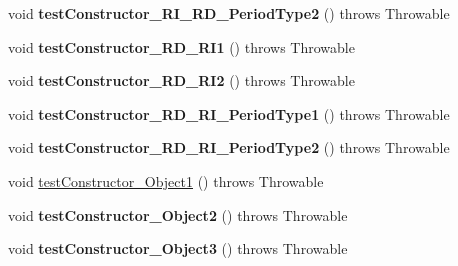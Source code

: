 \begin{DoxyCompactItemize}
\item 
\hypertarget{classorg_1_1joda_1_1time_1_1_test_period___constructors_abe4348279d9c3c1cb35042d17695a446}{void {\bfseries test\-Constructor\-\_\-\-R\-I\-\_\-\-R\-D\-\_\-\-Period\-Type2} ()  throws Throwable }\label{classorg_1_1joda_1_1time_1_1_test_period___constructors_abe4348279d9c3c1cb35042d17695a446}

\item 
\hypertarget{classorg_1_1joda_1_1time_1_1_test_period___constructors_ae15ae9a6ff55c679ef38916bf9cb82c7}{void {\bfseries test\-Constructor\-\_\-\-R\-D\-\_\-\-R\-I1} ()  throws Throwable }\label{classorg_1_1joda_1_1time_1_1_test_period___constructors_ae15ae9a6ff55c679ef38916bf9cb82c7}

\item 
\hypertarget{classorg_1_1joda_1_1time_1_1_test_period___constructors_a23d6eb392bccca0793971d33010d9e8f}{void {\bfseries test\-Constructor\-\_\-\-R\-D\-\_\-\-R\-I2} ()  throws Throwable }\label{classorg_1_1joda_1_1time_1_1_test_period___constructors_a23d6eb392bccca0793971d33010d9e8f}

\item 
\hypertarget{classorg_1_1joda_1_1time_1_1_test_period___constructors_a16fbaf9ef12c96666bacb841215ccca3}{void {\bfseries test\-Constructor\-\_\-\-R\-D\-\_\-\-R\-I\-\_\-\-Period\-Type1} ()  throws Throwable }\label{classorg_1_1joda_1_1time_1_1_test_period___constructors_a16fbaf9ef12c96666bacb841215ccca3}

\item 
\hypertarget{classorg_1_1joda_1_1time_1_1_test_period___constructors_aa684f3c626f57d73267c97d3e49c3b7b}{void {\bfseries test\-Constructor\-\_\-\-R\-D\-\_\-\-R\-I\-\_\-\-Period\-Type2} ()  throws Throwable }\label{classorg_1_1joda_1_1time_1_1_test_period___constructors_aa684f3c626f57d73267c97d3e49c3b7b}

\item 
void \hyperlink{classorg_1_1joda_1_1time_1_1_test_period___constructors_a3dd47d1b989b0ef6ff874057cb79099a}{test\-Constructor\-\_\-\-Object1} ()  throws Throwable 
\item 
\hypertarget{classorg_1_1joda_1_1time_1_1_test_period___constructors_a1e097c4d310245381badb4e37c38e78f}{void {\bfseries test\-Constructor\-\_\-\-Object2} ()  throws Throwable }\label{classorg_1_1joda_1_1time_1_1_test_period___constructors_a1e097c4d310245381badb4e37c38e78f}

\item 
\hypertarget{classorg_1_1joda_1_1time_1_1_test_period___constructors_a0f1b1974dc874ce163ee34246fd67f61}{void {\bfseries test\-Constructor\-\_\-\-Object3} ()  throws Throwable }\label{classorg_1_1joda_1_1time_1_1_test_period___constructors_a0f1b1974dc874ce163ee34246fd67f61}


\end{DoxyCompactItemize}
